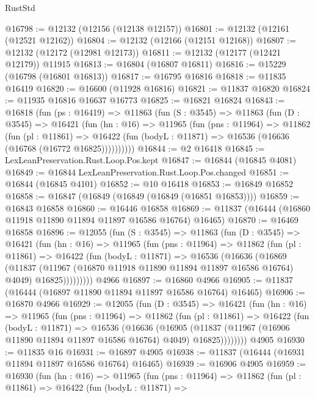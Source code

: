 \begin{lexlean}{RustStd}
\begin{coremodule}
@16798 := @12132 (@12156 (@12138 @12157))
@16801 := @12132 (@12161 (@12521 @12162))
@16804 := @12132 (@12166 (@12151 @12168))
@16807 := @12132 (@12172 (@12981 @12173))
@16811 := @12132 (@12177 (@12421 @12179)) @11915
@16813 := @16804 (@16807 @16811)
@16816 := @15229 (@16798 (@16801 @16813))
@16817 := @16795 @16816
@16818 := @11835 @16419
@16820 := @16600 (@11928 @16816)
@16821 := @11837 @16820
@16824 := @11935 @16816 @16637 @16773
@16825 := @16821 @16824
@16843 := @16818
    (fun (ps : @16419) =>
    @11863
      (fun (S : @3545) =>
      @11863
        (fun (D : @3545) =>
        @16421
          (fun (hn : @16) =>
          @11965
            (fun (pns : @11964) =>
            @11862
              (fun (pl : @11861) =>
              @16422 (fun (bodyL : @11871) => @16536 (@16636 (@16768 (@16772 @16825))))))))))
@16844 := @2 @16418
@16845 := LexLeanPreservation.Rust.Loop.Pos.kept
@16847 := @16844 (@16845 @4081)
@16849 := @16844 LexLeanPreservation.Rust.Loop.Pos.changed
@16851 := @16844 (@16845 @4101)
@16852 := @10 @16418
@16853 := @16849 @16852
@16858 := @16847 (@16849 (@16849 (@16849 (@16851 @16853))))
@16859 := @16843 @16858
@16860 := @16446 @16858
@16869 := @11837 (@16444 (@16860 @11918 @11890 @11894 @11897 @16586 @16764) @16465)
@16870 := @16469 @16858
@16896 := @12055
    (fun (S : @3545) =>
    @11863
      (fun (D : @3545) =>
      @16421
        (fun (hn : @16) =>
        @11965
          (fun (pns : @11964) =>
          @11862
            (fun (pl : @11861) =>
            @16422
              (fun (bodyL : @11871) =>
              @16536
                (@16636
                  (@16869
                    (@11837
                      (@11967 (@16870 @11918 @11890 @11894 @11897 @16586 @16764) @4049)
                      @16825)))))))))
    @4966
@16897 := @16860 @4966
@16905 := @11837 (@16444 (@16897 @11890 @11894 @11897 @16586 @16764) @16465)
@16906 := @16870 @4966
@16929 := @12055
    (fun (D : @3545) =>
    @16421
      (fun (hn : @16) =>
      @11965
        (fun (pns : @11964) =>
        @11862
          (fun (pl : @11861) =>
          @16422
            (fun (bodyL : @11871) =>
            @16536
              (@16636
                (@16905
                  (@11837 (@11967 (@16906 @11890 @11894 @11897 @16586 @16764) @4049) @16825))))))))
    @4905
@16930 := @11835 @16
@16931 := @16897 @4905
@16938 := @11837 (@16444 (@16931 @11894 @11897 @16586 @16764) @16465)
@16939 := @16906 @4905
@16959 := @16930
    (fun (hn : @16) =>
    @11965
      (fun (pns : @11964) =>
      @11862
        (fun (pl : @11861) =>
        @16422
          (fun (bodyL : @11871) =>

\end{coremodule}
\end{lexlean}
